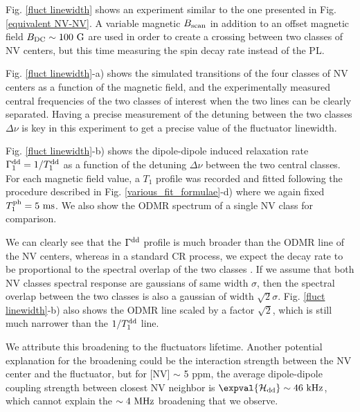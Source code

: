 \documentclass[a4paper,11pt]{report}
\begin{document}
\begin{refsection}
Fig. \ref{fluct linewidth} shows an experiment similar to the one presented in Fig. \ref{equivalent NV-NV}. A variable magnetic $B_{\rm scan}$ in addition to an offset magnetic field $B_{\rm DC} \sim 100\ \rm G$ are used in order to create a crossing between two classes of NV centers, but this time measuring the spin decay rate instead of the PL.

Fig. \ref{fluct linewidth}-a) shows the simulated transitions of the four classes of NV centers as a function of the magnetic field, and the experimentally measured central frequencies of the two classes of interest when the two lines can be clearly separated. Having a precise measurement of the detuning between the two classes $\Delta \nu$ is key in this experiment to get a precise value of the fluctuator linewidth.

Fig. \ref{fluct linewidth}-b) shows the dipole-dipole induced relaxation rate $\Gamma_1^{\rm dd}=1/T_1^{\rm dd}$ as a function of the detuning $\Delta \nu$ between the two central classes. For each magnetic field value, a $T_1$ profile was recorded and fitted following the procedure described in Fig. \ref{various_fit_formulae}-d) where we again fixed $T_1^{\rm ph}=5\ \rm ms$. We also show the ODMR spectrum of a single NV class for comparison.

We can clearly see that the $\Gamma^{\rm dd}$ profile is much broader than the ODMR line of the NV centers, whereas in a standard CR process, we expect the decay rate to be proportional to the spectral overlap of the two classes \citep{hall2016detection}. If we assume that both NV classes spectral response are gaussians of same width $\sigma$, then the spectral overlap between the two classes is also a gaussian of width $\sqrt{2} \sigma$. Fig. \ref{fluct linewidth}-b) also shows the ODMR line scaled by a factor $\sqrt{2}$, which is still much narrower than the $1/T_1^{\rm dd}$ line.

We attribute this broadening to the fluctuators lifetime. Another potential explanation for the broadening could be the interaction strength between the NV center and the fluctuator, but for [NV] $\sim$ 5 ppm, the average dipole-dipole coupling strength between closest NV neighbor is $\expval{\mathcal{H}_{\rm dd}} \sim 46\ \rm kHz$, which cannot explain the $\sim 4\ \rm MHz$ broadening that we observe.


\end{refsection}
\end{document}
